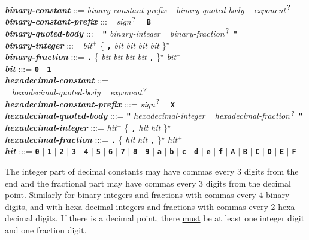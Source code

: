 \documentclass[12pt]{article}
\newcommand{\TT}[1]{{\tt \bfseries #1}}
\newcommand{\STAR}{{\Large $^\star$}}
\newcommand{\PLUS}[1][]{{$^{+#1}$}}
\newcommand{\QMARK}{{$^{\,\mbox{\footnotesize ?}}$}}
\newcommand{\emkey}[1]{{\em \bfseries #1}}
\newenvironment{indpar}[1][0.3in]%
	{\begin{list}{}%
		     {\setlength{\itemsep}{0in}%
		      \setlength{\topsep}{0in}%
		      \setlength{\parsep}{1ex}%
		      \setlength{\labelwidth}{#1}%
		      \setlength{\leftmargin}{#1}%
		      \addtolength{\leftmargin}{\labelsep}}%
	 \item}%
	{\end{list}}
\begin{document}
\begin{indpar}
 \\[0.5ex]
\emkey{binary-constant} ::= {\em binary-constant-prefix} ~
                              {\em binary-quoted-body} ~
			      {\em exponent}\QMARK{}
\\[0.5ex]
\emkey{binary-constant-prefix} :::= {\em sign}\QMARK{} ~ \TT{B}
\\[0.5ex]
\emkey{binary-quoted-body} :::= \TT{"} {\em binary-integer} ~
				{\em binary-fraction}\QMARK{} \TT{"}
\\[0.5ex]
\emkey{binary-integer}
    :::= {\em bit}\PLUS{}
           \{ \TT{,} {\em bit} {\em bit} {\em bit} {\em bit} \}\STAR{} \\
\emkey{binary-fraction} :::=
    \TT{.} \{ {\em bit} {\em bit} {\em bit} {\em bit} \TT{,} \}\STAR{}
    {\em bit}\PLUS{} \\
\emkey{bit} :::= \TT{0} $|$ \TT{1}
 \\[0.5ex]
\emkey{hexadecimal-constant} ::= \\
\hspace*{0.5in}{\em hexadecimal-constant-prefix} ~
               {\em hexadecimal-quoted-body} ~
	       {\em exponent}\QMARK{}
\\[0.5ex]
\emkey{hexadecimal-constant-prefix} :::= {\em sign}\QMARK{} ~ \TT{X}
\\[0.5ex]
\emkey{hexadecimal-quoted-body} :::= \TT{"} {\em hexadecimal-integer} ~
				     {\em hexadecimal-fraction}\QMARK{} \TT{"}
\\[0.5ex]
\emkey{hexadecimal-integer}
    :::= {\em hit}\PLUS{}
           \{ \TT{,} {\em hit} {\em hit} \}\STAR{} \\
\emkey{hexadecimal-fraction} :::=
    \TT{.} \{ {\em hit} {\em hit} \TT{,} \}\STAR{}
    {\em hit}\PLUS{} \\
\emkey{hit} :::= \TT{0} $|$ \TT{1} $|$ \TT{2} $|$ \TT{3} $|$ \TT{4}
	     $|$ \TT{5} $|$ \TT{6} $|$ \TT{7} $|$ \TT{8} $|$ \TT{9}
	     $|$ \TT{a} $|$ \TT{b} $|$ \TT{c} $|$ \TT{d} $|$ \TT{e} $|$ \TT{f}
	     $|$ \TT{A} $|$ \TT{B} $|$ \TT{C} $|$ \TT{D} $|$ \TT{E} $|$ \TT{F}
\end{indpar}

The integer part of decimal constants may have commas
every 3 digits from the end and the fractional part may have
commas every 3 digits from the decimal point.
Similarly for binary integers and fractions with commas every 4 binary
digits,
and with hexa-decimal integers and fractions with commas every 2
hexa-decimal digits.
If there is a decimal point, there \underline{must}
be at least one integer digit and
one fraction digit.
\end{document}
